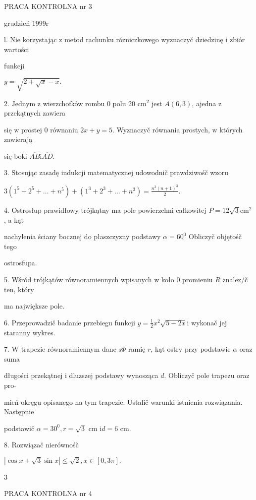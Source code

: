 \documentclass[a4paper,12pt]{article}
\begin{document}
PRACA KONTROLNA nr 3

grudzień $1999\mathrm{r}$

l. Nie korzystając $\mathrm{z}$ metod rachunku rózniczkowego wyznaczyč dziedzinę $\mathrm{i}$ zbiór wartości

funkcji

$y=\sqrt{2+\sqrt{x}-x}.$

2. Jednym $\mathrm{z}$ wierzchofków rombu $0$ polu 20 $\mathrm{c}\mathrm{m}^{2}$ jest $A(6,3)$, ajedna $\mathrm{z}$ przekątnych zawiera

się $\mathrm{w}$ prostej $0$ równaniu $2x+y=5$. Wyznaczyč równania prostych, $\mathrm{w}$ których zawierają

się boki $\overline{AB} \mathrm{i} \overline{AD}.$

3. Stosując zasadę indukcji matematycznej udowodnič prawdziwośč wzoru

$3(1^{5}+2^{5}+\displaystyle \ldots+n^{5})+(1^{3}+2^{3}+\ldots+n^{3})=\frac{n^{3}(n+1)^{3}}{2}.$

4. Ostrosłup prawidłowy trójkątny ma pole powierzchni całkowitej $P = 12\sqrt{3}\mathrm{c}\mathrm{m}^{2}$, a kąt

nachylenia ściany bocznej do płaszczyzny podstawy $\alpha = 60^{0}$ Obliczyč objętośč tego

ostrosfupa.

5. Wśród trójkątów równoramiennych wpisanych $\mathrm{w}$ koło $0$ promieniu $R$ znalez/č ten, który

ma największe pole.

6. Przeprowadzič badanie przebiegu funkcji $y=\displaystyle \frac{1}{2}x^{2}\sqrt{5-2x}\mathrm{i}$ wykonač jej staranny wykres.

7. $\mathrm{W}$ trapezie równoramiennym dane $\mathrm{s}\Phi$ ramię $r$, kąt ostry przy podstawie $\alpha$ oraz suma

długości przekątnej $\mathrm{i}$ dluzszej podstawy wynosząca $d$. Obliczyč pole trapezu oraz pro-

mień okręgu opisanego na tym trapezie. Ustalič warunki istnienia rozwiązania. Następnie

podstawič $\alpha=30^{0}, r=\sqrt{3}$ cm $\mathrm{i} d=6$ cm.

8. Rozwiązač nierównośč

$|\cos x+\sqrt{3}\sin x|\leq\sqrt{2},x\in[0,3\pi].$

3





PRACA KONTROLNA nr 4
\end{document}

